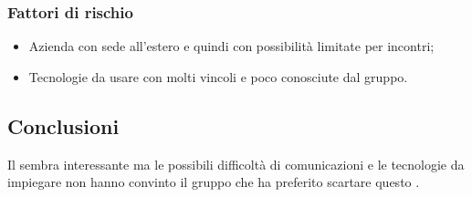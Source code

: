\documentclass[../StudioDiFattibilita.tex]{subfiles}
\begin{document}
			\subsubsection{Fattori di rischio}
				\begin{itemize}
				\item Azienda con sede all'estero e quindi con possibilità limitate per incontri;
				\item Tecnologie da usare con molti vincoli e poco conosciute dal gruppo.
			\end{itemize}
			
			\subsection{Conclusioni}
			Il  sembra interessante ma le possibili difficoltà di comunicazioni e le tecnologie da impiegare non hanno convinto il gruppo che ha preferito scartare questo .
\end{document}
